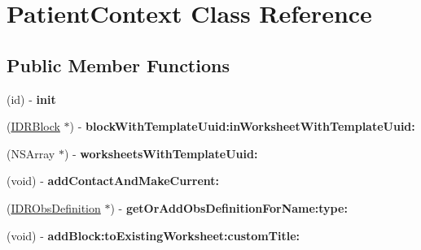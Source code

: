 \hypertarget{interface_patient_context}{
\section{PatientContext Class Reference}
\label{interface_patient_context}
}
\subsection*{Public Member Functions}
\begin{DoxyCompactItemize}
\item 
\hypertarget{interface_patient_context_a4a7f9487f06b740268acf58bae5a2203}{
(id) -\/ {\bfseries init}}
\label{interface_patient_context_a4a7f9487f06b740268acf58bae5a2203}

\item 
\hypertarget{interface_patient_context_a705717db6ac7b57f7c0bd4091f4e5f24}{
(\hyperlink{interface_i_d_r_block}{IDRBlock} $\ast$) -\/ {\bfseries blockWithTemplateUuid:inWorksheetWithTemplateUuid:}}
\label{interface_patient_context_a705717db6ac7b57f7c0bd4091f4e5f24}

\item 
\hypertarget{interface_patient_context_a94b06aa031e616240382719a16950fec}{
(NSArray $\ast$) -\/ {\bfseries worksheetsWithTemplateUuid:}}
\label{interface_patient_context_a94b06aa031e616240382719a16950fec}

\item 
\hypertarget{interface_patient_context_aad7cdd8279f1be6b5e2dd7ab52fc606f}{
(void) -\/ {\bfseries addContactAndMakeCurrent:}}
\label{interface_patient_context_aad7cdd8279f1be6b5e2dd7ab52fc606f}

\item 
\hypertarget{interface_patient_context_ad8cb42675dbd38096f34466d90cde59c}{
(\hyperlink{interface_i_d_r_obs_definition}{IDRObsDefinition} $\ast$) -\/ {\bfseries getOrAddObsDefinitionForName:type:}}
\label{interface_patient_context_ad8cb42675dbd38096f34466d90cde59c}

\item 
\hypertarget{interface_patient_context_a820e655485e8cd8ab1d45212bfa02433}{
(void) -\/ {\bfseries addBlock:toExistingWorksheet:customTitle:}}
\label{interface_patient_context_a820e655485e8cd8ab1d45212bfa02433}

\end{DoxyCompactItemize}
